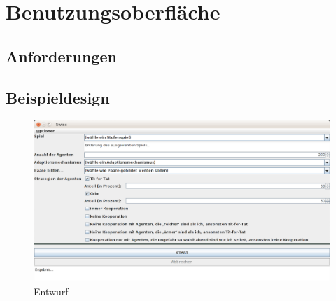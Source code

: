 \section{Benutzungsoberfläche}

\subsection{Anforderungen}

\subsection{Beispieldesign}

\begin{figure}[htbp] 
  \centering
     \includegraphics[width=1.0\textwidth]{GUI_Entwurf/Benutzeroberflaeche(1).png}
  \caption{Entwurf}
  \label{fig:Bild1}
\end{figure}
